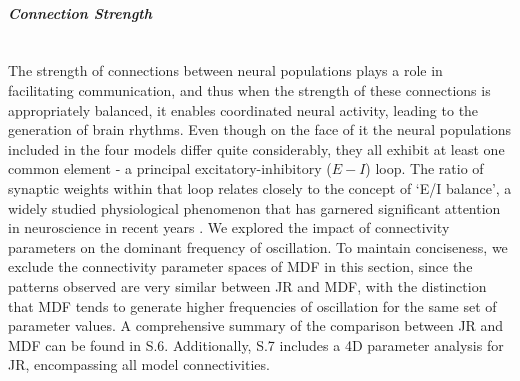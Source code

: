 \documentclass[12pt,twoside]{article}
\begin{document}


\paragraph{\textit{Connection Strength}} ~\\
The strength of connections between neural populations plays a role in facilitating communication, and thus when the strength of these connections is appropriately balanced, it enables coordinated neural activity, leading to the generation of brain rhythms. Even though on the face of it the neural populations included in the four models differ quite considerably, they all exhibit at least one common element - a principal excitatory-inhibitory ($E - I$) loop. The ratio of synaptic weights within that loop relates closely to the concept of `E/I balance', a widely studied physiological phenomenon that has garnered significant attention in neuroscience in recent years \citep{meisel2017decline, zhou2018synaptic, sohal2019excitation, murray2014linking}. We explored the impact of connectivity parameters on the dominant frequency of oscillation. To maintain conciseness, we exclude the connectivity parameter spaces of MDF in this section, since the patterns observed are very similar between JR and MDF, with the distinction that MDF tends to generate higher frequencies of oscillation for the same set of parameter values. A comprehensive summary of the comparison between JR and MDF can be found in S.6. Additionally, S.7 includes a 4D parameter analysis for JR, encompassing all model connectivities.
\end{document}
